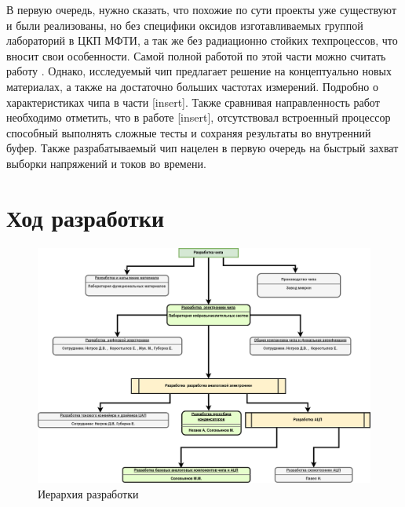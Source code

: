 \documentclass[a4paper,12pt]{article} %
\begin{document}
В первую очередь, нужно сказать, что похожие по сути проекты уже существуют и были реализованы, но без специфики оксидов изготавливаемых группой лабораторий в ЦКП МФТИ, а так же без радиационно стойких техпроцессов, что вносит свои особенности. Самой полной работой по этой части можно считать работу \cite{FRAM}. Однако, исследуемый чип предлагает решение на концептуально новых материалах, а также на достаточно больших частотах измерений. Подробно о характеристиках чипа в части [insert]. Также сравнивая направленность работ необходимо отметить, что в работе [insert], отсутствовал встроенный процессор способный выполнять сложные тесты и сохраняя результаты во внутренний буфер. Также разрабатываемый чип нацелен в первую очередь на быстрый захват выборки напряжений и токов во времени.

\section{Ход разработки}

\begin{figure}[H]
    \includegraphics[width=\textwidth]{struct.png}
    \caption{Иерархия разработки}
    \label{pic:struct}
\end{figure}
\end{document}
